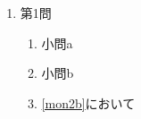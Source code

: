 \begin{enumerate}
	\item 第1問
	\begin{enumerate}
		\item 小問a
		\item\label{mon2b}小問b
		\item \ref{mon2b}において
	\end{enumerate}
\end{enumerate}
